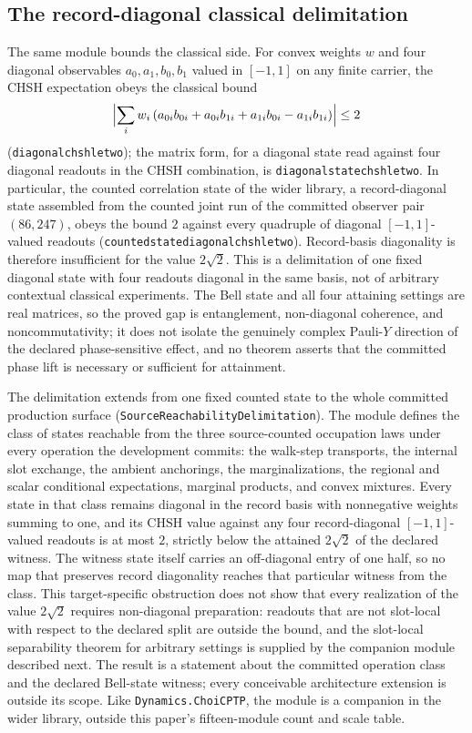 \documentclass[11pt]{article}
\renewcommand{\_}{\textunderscore\allowbreak}
\theoremstyle{remark}
\begin{document}
\subsection{The record-diagonal classical delimitation}
\label{subsec:delimitation}

The same module bounds the classical side. For convex weights $w$ and four
diagonal observables $a_0,a_1,b_0,b_1$ valued in $[-1,1]$ on any finite
carrier, the CHSH expectation obeys the classical bound
\[
 \Bigl|\sum_i w_i\,
 (a_{0i}b_{0i}+a_{0i}b_{1i}+a_{1i}b_{0i}-a_{1i}b_{1i})\Bigr|\le2
\]
(\texttt{diagonal\_chsh\_le\_two}); the matrix form, for a diagonal state
read against four diagonal readouts in the CHSH combination, is
\texttt{diagonal\_state\_chsh\_le\_two}. In particular, the counted
correlation state of the wider library, a record-diagonal state assembled
from the counted joint run of the committed observer pair $(86,247)$,
obeys the bound $2$ against every quadruple of diagonal $[-1,1]$-valued
readouts (\texttt{counted\_state\_diagonal\_chsh\_le\_two}). Record-basis
diagonality is therefore insufficient for the value $2\sqrt2$. This is a
delimitation of one fixed diagonal state with four readouts diagonal in the
same basis, not of arbitrary contextual classical experiments. The Bell
state and all four attaining settings are real matrices, so the proved gap is
entanglement, non-diagonal coherence, and noncommutativity; it does not isolate
the genuinely complex Pauli-$Y$ direction of the declared phase-sensitive
effect, and no theorem asserts that the committed phase lift is necessary or
sufficient for attainment.

The delimitation extends from one fixed counted state to the whole committed
production surface
(\texttt{SourceReachabilityDelimitation}). The module defines the class
of states reachable from the three source-counted occupation laws under
every operation the development commits: the walk-step transports, the
internal slot exchange, the ambient anchorings, the marginalizations, the
regional and scalar conditional expectations, marginal products, and convex
mixtures. Every state in that class remains diagonal in the record basis
with nonnegative weights summing to one, and its CHSH value against any four
record-diagonal $[-1,1]$-valued readouts is at most $2$, strictly below the
attained $2\sqrt2$ of the declared witness. The witness state itself carries an
off-diagonal entry of one half, so no map that preserves record diagonality
reaches that particular witness from the class. This target-specific
obstruction does not show that every realization of the value $2\sqrt2$
requires non-diagonal preparation: readouts that are not slot-local with
respect to the declared split are outside the bound, and the slot-local
separability theorem for arbitrary settings is supplied by the companion
module described next. The result is a statement about the committed
operation class and the declared Bell-state witness; every conceivable
architecture extension is outside its scope. Like \texttt{Dynamics.ChoiCPTP},
the module is a companion in the wider library, outside this paper's
fifteen-module count and scale table.
\end{document}

